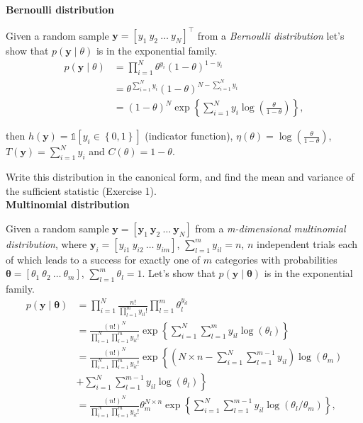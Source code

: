 \begin{enumerate}
\textbf{Bernoulli distribution}

Given a random sample $\bm{y}=[y_1 \ y_2 \ \dots \ y_N]^{\top}$ from a \textit{Bernoulli distribution} let's show that $p(\bm{y}\mid \theta)$ is in the exponential family.
\begin{align}
	p(\bm{y}\mid \theta)&=\prod_{i=1}^N \theta^{y_i}(1-\theta)^{1-y_i}\nonumber\\
	&=\theta^{\sum_{i=1}^N y_i}(1-\theta)^{N-\sum_{i=1}^N y_i}\nonumber\\
	&=(1-\theta)^N\exp\left\{\sum_{i=1}^N y_i\log\left(\frac{\theta}{1-\theta}\right)\right\}\nonumber,
\end{align}

then $h(\bm{y})=\mathds{1}[y_i\in\left\{0,1\right\}]$ (indicator function), $\eta(\theta)=\log\left(\frac{\theta}{1-\theta}\right)$, $T(\bm{y})=\sum_{i=1}^N y_i$ and $C(\theta)=1-\theta$.

Write this distribution in the canonical form, and find the mean and variance of the sufficient statistic (Exercise 1).\\ 

\textbf{Multinomial distribution} 

Given a random sample $\bm{y}=[\bm{y}_1 \ \bm{y}_2 \ \dots \ \bm{y}_N]$ from a \textit{m-dimensional multinomial distribution}, where $\bm{y}_i=\left[y_{i1} \ y_{i2} \ \dots \ y_{im}\right]$, $\sum_{l=1}^m y_{il}=n$, $n$ independent trials each of which leads to a success for exactly one of $m$ categories with probabilities $\bm{\theta}=[\theta_1 \ \theta_2 \ \dots \ \theta_m]$, $\sum_{l=1}^m \theta_l=1$. Let's show that $p(\bm{y}\mid \bm{\theta})$ is in the exponential family.
\begin{align}
	p(\bm{y}\mid \bm{\theta})&=\prod_{i=1}^N \frac{n!}{\prod_{l=1}^m y_{il}!} \prod_{l=1}^m\theta_l^{y_{il}}\nonumber\\
	&=\frac{(n!)^N}{\prod_{i=1}^N\prod_{l=1}^m y_{il}!}\exp\left\{\sum_{i=1}^N\sum_{l=1}^m y_{il}\log(\theta_l)\right\}\nonumber\\
	&=\frac{(n!)^N}{\prod_{i=1}^N\prod_{l=1}^m y_{il}!}\exp\left\{\left(N\times n-\sum_{i=1}^N\sum_{l=1}^{m-1}y_{il}\right)\log(\theta_m)\nonumber\right. \\
	&\left.+\sum_{i=1}^N\sum_{l=1}^{m-1}y_{il}\log(\theta_l)\right\}\nonumber\\
	&=\frac{(n!)^N}{\prod_{i=1}^N\prod_{l=1}^m y_{il}!}\theta_m^{N\times n}\exp\left\{\sum_{i=1}^N\sum_{l=1}^{m-1}y_{il}\log(\theta_l/\theta_m)\right\}\nonumber,
\end{align}


\end{enumerate}
